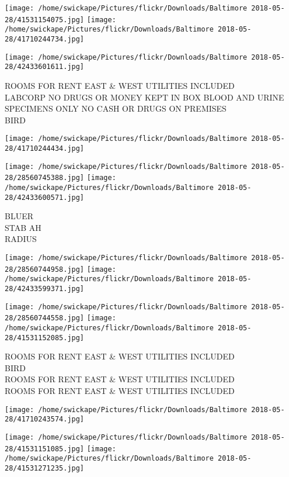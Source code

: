 \documentclass[10pt,letterpaper]{article}
\begin{document}
\texttt{[image: /home/swickape/Pictures/flickr/Downloads/Baltimore 2018-05-28/41531154075.jpg]}
\texttt{[image: /home/swickape/Pictures/flickr/Downloads/Baltimore 2018-05-28/41710244734.jpg]}

\texttt{[image: /home/swickape/Pictures/flickr/Downloads/Baltimore 2018-05-28/42433601611.jpg]}

ROOMS FOR RENT EAST \& WEST UTILITIES INCLUDED\\
LABCORP NO DRUGS OR MONEY KEPT IN BOX BLOOD AND URINE SPECIMENS ONLY NO CASH OR DRUGS ON PREMISES\\
BIRD\\
\pagebreak

\texttt{[image: /home/swickape/Pictures/flickr/Downloads/Baltimore 2018-05-28/41710244434.jpg]}

\vspace{0.25in}
\texttt{[image: /home/swickape/Pictures/flickr/Downloads/Baltimore 2018-05-28/28560745388.jpg]}
\texttt{[image: /home/swickape/Pictures/flickr/Downloads/Baltimore 2018-05-28/42433600571.jpg]}

BLUER\\
STAB AH\\
RADIUS\\
\pagebreak

\texttt{[image: /home/swickape/Pictures/flickr/Downloads/Baltimore 2018-05-28/28560744958.jpg]}
\texttt{[image: /home/swickape/Pictures/flickr/Downloads/Baltimore 2018-05-28/42433599371.jpg]}

\texttt{[image: /home/swickape/Pictures/flickr/Downloads/Baltimore 2018-05-28/28560744558.jpg]}
\texttt{[image: /home/swickape/Pictures/flickr/Downloads/Baltimore 2018-05-28/41531152085.jpg]}

ROOMS FOR RENT EAST \& WEST UTILITIES INCLUDED\\
BIRD\\
ROOMS FOR RENT EAST \& WEST UTILITIES INCLUDED\\
ROOMS FOR RENT EAST \& WEST UTILITIES INCLUDED\\
\pagebreak

\texttt{[image: /home/swickape/Pictures/flickr/Downloads/Baltimore 2018-05-28/41710243574.jpg]}

\vspace{0.25in}
\texttt{[image: /home/swickape/Pictures/flickr/Downloads/Baltimore 2018-05-28/41531151085.jpg]}
\texttt{[image: /home/swickape/Pictures/flickr/Downloads/Baltimore 2018-05-28/41531271235.jpg]}
\end{document}
